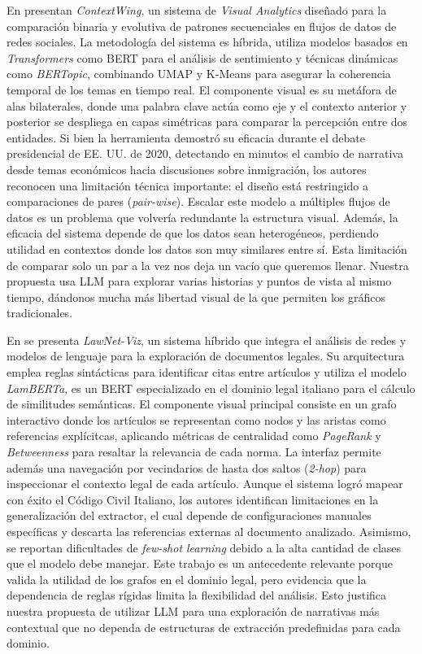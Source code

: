 En \cite{zhao2023contextwing} presentan \textit{ContextWing}, un sistema de \textit{Visual Analytics} diseñado para la comparación binaria y evolutiva de patrones secuenciales en flujos de datos de redes sociales. La metodología del sistema es híbrida, utiliza modelos basados en \textit{Transformers} como \acs{BERT} para el análisis de sentimiento y técnicas dinámicas como \textit{BERTopic}, combinando \ac{UMAP} y K-Means para asegurar la coherencia temporal de los temas en tiempo real. El componente visual es su metáfora de alas bilaterales, donde una palabra clave actúa como eje y el contexto anterior y posterior se despliega en capas simétricas para comparar la percepción entre dos entidades. Si bien la herramienta demostró su eficacia durante el debate presidencial de EE. UU. de 2020, detectando en minutos el cambio de narrativa desde temas económicos hacia discusiones sobre inmigración, los autores reconocen una limitación técnica importante: el diseño está restringido a comparaciones de pares (\textit{pair-wise}). Escalar este modelo a múltiples flujos de datos es un problema que volvería redundante la estructura visual. Además, la eficacia del sistema depende de que los datos sean heterogéneos, perdiendo utilidad en contextos donde los datos son muy similares entre sí. Esta limitación de comparar solo un par a la vez nos deja un vacío que queremos llenar. Nuestra propuesta usa \acs{LLM} para explorar varias historias y puntos de vista al mismo tiempo, dándonos mucha más libertad visual de la que permiten los gráficos tradicionales.







En \cite{lacava2022} se presenta \textit{LawNet-Viz}, un sistema híbrido que integra el análisis de redes y modelos de lenguaje para la exploración de documentos legales. Su arquitectura emplea reglas sintácticas para identificar citas entre artículos y utiliza el modelo \textit{LamBERTa}, es un \acs{BERT} especializado en el dominio legal italiano para el cálculo de similitudes semánticas. El componente visual principal consiste en un grafo interactivo donde los artículos se representan como nodos y las aristas como referencias explícitcas, aplicando métricas de centralidad como \textit{PageRank} y \textit{Betweenness} para resaltar la relevancia de cada norma. La interfaz permite además una navegación por vecindarios de hasta dos saltos (\textit{2-hop}) para inspeccionar el contexto legal de cada artículo. Aunque el sistema logró mapear con éxito el Código Civil Italiano, los autores identifican limitaciones en la generalización del extractor, el cual depende de configuraciones manuales específicas y descarta las referencias externas al documento analizado. Asimismo, se reportan dificultades de \textit{few-shot learning} debido a la alta cantidad de clases que el modelo debe manejar. Este trabajo es un antecedente relevante porque valida la utilidad de los grafos en el dominio legal, pero evidencia que la dependencia de reglas rígidas limita la flexibilidad del análisis. Esto justifica nuestra propuesta de utilizar \acs{LLM} para una exploración de narrativas más contextual que no dependa de estructuras de extracción predefinidas para cada dominio.




